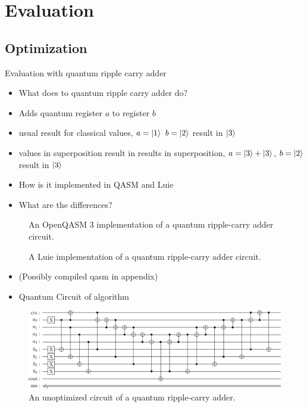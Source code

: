 \chapter{Evaluation}
\label{ch:evaluation}


\section{Optimization}
\label{sec:eval_optimization}
Evaluation with quantum ripple carry adder~\cite{CDKM04}
\begin{itemize}
    \item What does to quantum ripple carry adder do?
    \item Adds quantum register $a$ to register $b$
    \item usual result for classical values, $a = \ket{1}$ $b = \ket{2}$ result in $\ket{3}$
    \item values in superposition result in results in superposition, $a = \ket{3} + \ket{3}$, $b = \ket{2}$ result in $\ket{3}$
    \item How is it implemented in QASM and Luie
    \item What are the differences?
\end{itemize}

\begin{figure}[htp]
    \centering     
    
    \caption{An OpenQASM 3 implementation of a quantum ripple-carry adder circuit.}
    \label{fig:eval_adder_qasm}
\end{figure}

\begin{figure}[htp]
    \centering     
    
    \caption{A Luie implementation of a quantum ripple-carry adder circuit.}
    \label{fig:eval_adder_luie}
\end{figure}

\begin{itemize}
    \item (Possibly compiled qasm in appendix)
    \item Quantum Circuit of algorithm  
\end{itemize}

\begin{figure}[htp]
    \centering     
    \includegraphics[width=\textwidth]{../figures/images/adderCircuit.png}
    \caption{An unoptimized circuit of a quantum ripple-carry adder.}
    \label{fig:eval_adder_circuit}
\end{figure}

